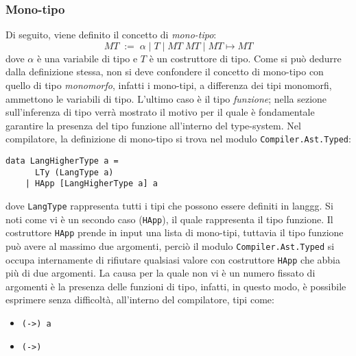 \documentclass[10pt,a4paper]{article}
\begin{document}
\subsubsection{Mono-tipo}
Di seguito, viene definito il concetto di \textit{mono-tipo}:
\[ MT \; := \; \alpha \; | \; T \; | \; MT \; MT \; | \; MT \mapsto MT \]
dove $ \alpha $ è una variabile di tipo e $ T $ è un costruttore di tipo. Come si può dedurre dalla definizione stessa,
non si deve confondere
il concetto di mono-tipo con quello di tipo \textit{monomorfo}, infatti i mono-tipi, a differenza dei tipi monomorfi,
ammettono le variabili di tipo. L'ultimo caso è il tipo \textit{funzione}; nella sezione sull'inferenza di tipo verrà
mostrato il motivo per il quale è fondamentale garantire la presenza del tipo funzione all'interno del type-system.
Nel compilatore, la definizione di mono-tipo si trova nel modulo \texttt{Compiler.Ast.Typed}:
\begin{lstlisting}
data LangHigherType a =
      LTy (LangType a)
    | HApp [LangHigherType a] a
\end{lstlisting}
dove \texttt{LangType} rappresenta tutti i tipi che possono essere definiti in langgg. Si noti come vi è un secondo
caso (\texttt{HApp}), il quale rappresenta il tipo funzione. Il costruttore \texttt{HApp} prende in input una lista
di mono-tipi, tuttavia il tipo funzione può avere al massimo due argomenti, perciò il modulo \texttt{Compiler.Ast.Typed}
si occupa internamente di rifiutare qualsiasi valore con costruttore \texttt{HApp} che abbia più di due argomenti.
La causa per la quale non vi è un numero fissato di argomenti è la presenza delle funzioni di tipo, infatti,
in questo modo, è possibile esprimere senza difficoltà, all'interno del compilatore, tipi come:
\begin{itemize}
\item \texttt{(->) a}
\item \texttt{(->)}
\end{itemize}
\end{document}
